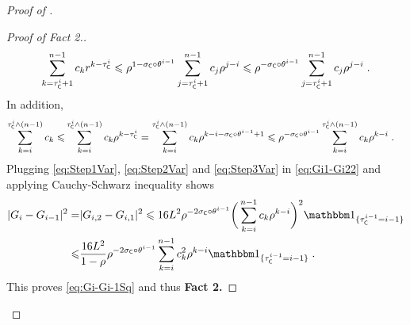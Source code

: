 \documentclass[leqno,11pt,a4paper]{article}
\begin{document}
\begin{proof}[Proof of ]
\begin{proof}[Proof of Fact 2.]
\begin{equation}\label{eq:Step2Var}
\sum_{k=\tau_{\mathsf{C}}^i+1}^{n-1}c_kr^{k-\tau_{\mathsf{C}}^i}\leqslant \rho^{1-\sigma_{\mathsf{C}}\circ\theta^{i-1}} \sum_{j=\tau^i_{\mathsf{C}}+1}^{n-1}c_j\rho^{j-i}\leqslant \rho^{-\sigma_{\mathsf{C}}\circ\theta^{i-1}}\sum_{j=\tau^i_{\mathsf{C}}+1}^{n-1}c_j\rho^{j-i}\;.
\end{equation}
In addition,
\begin{align}\label{eq:Step3Var}
 \sum_{k=i}^{\tau_{\mathsf{C}}^i\wedge (n-1)}c_k\leqslant &\sum_{k=i}^{\tau_{\mathsf{C}}^i\wedge (n-1)}c_k\rho^{k-\tau_{\mathsf{C}}^i}=\sum_{k=i}^{\tau_{\mathsf{C}}^i\wedge (n-1)}c_k\rho^{k-i-\sigma_{\mathsf{C}}\circ\theta^{i-1}+1}\leqslant \rho^{-\sigma_{\mathsf{C}}\circ\theta^{i-1}}\sum_{k=i}^{\tau_{\mathsf{C}}^i\wedge (n-1)}c_k\rho^{k-i}\;.
\end{align}
Plugging \eqref{eq:Step1Var}, \eqref{eq:Step2Var} and \eqref{eq:Step3Var} in \eqref{eq:Gi1-Gi22} and applying Cauchy-Schwarz inequality shows
\begin{align*}
 |G_{i}-G_{i-1}|^2=&|G_{i,2}-G_{i,1}|^2\leqslant16L^2\rho^{-2\sigma_{\cC}\circ\theta^{i-1}}\bigg(\sum_{k=i}^{n-1}c_k\rho^{k-i}\bigg)^2\indiacc{\tau_{\cC}^{i-1}=i-1}\\
 \leqslant &\frac{16L^2}{1-\rho}\rho^{-2\sigma_{\cC}\circ\theta^{i-1}}\sum_{k=i}^{n-1}c_k^2\rho^{k-i}\indiacc{\tau_{\cC}^{i-1}=i-1}\eqsp.
\end{align*}
This proves \eqref{eq:Gi-Gi-1Sq} and thus {\bf Fact 2.}
\end{proof}



\end{proof}
\end{document}
